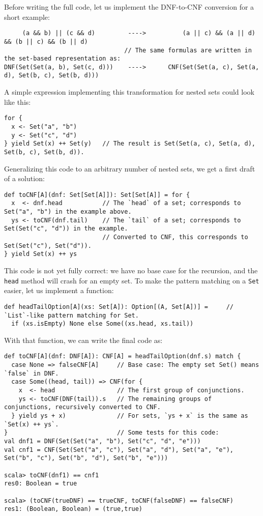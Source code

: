 Before writing the full code, let us implement the DNF-to-CNF conversion
for a short example: 
\begin{lstlisting}
     (a && b) || (c && d)         ---->          (a || c) && (a || d) && (b || c) && (b || d)
                                 // The same formulas are written in the set-based representation as:
DNF(Set(Set(a, b), Set(c, d)))    ---->      CNF(Set(Set(a, c), Set(a, d), Set(b, c), Set(b, d)))
\end{lstlisting}
A simple expression implementing this transformation for nested sets
could look like this: 
\begin{lstlisting}
for {
  x <- Set("a", "b")
  y <- Set("c", "d")
} yield Set(x) ++ Set(y)   // The result is Set(Set(a, c), Set(a, d), Set(b, c), Set(b, d)).
\end{lstlisting}
Generalizing this code to an arbitrary number of nested sets, we get
a first draft of a solution:
\begin{lstlisting}
def toCNF[A](dnf: Set[Set[A]]): Set[Set[A]] = for {
  x  <- dnf.head           // The `head` of a set; corresponds to Set("a", "b") in the example above.
  ys <- toCNF(dnf.tail)    // The `tail` of a set; corresponds to Set(Set("c", "d")) in the example.
                           // Converted to CNF, this corresponds to Set(Set("c"), Set("d")).
} yield Set(x) ++ ys  
\end{lstlisting}
This code is not yet fully correct: we have no base case for the recursion,
and the \lstinline!head! method will crash for an empty set. To make
the pattern matching on a \lstinline!Set! easier, let us implement
a function:
\begin{lstlisting}
def headTailOption[A](xs: Set[A]): Option[(A, Set[A])] =     // `List`-like pattern matching for Set.
  if (xs.isEmpty) None else Some((xs.head, xs.tail))
\end{lstlisting}
With that function, we can write the final code as:
\begin{lstlisting}
def toCNF[A](dnf: DNF[A]): CNF[A] = headTailOption(dnf.s) match {
  case None => falseCNF[A]     // Base case: The empty set Set() means `false` in DNF.
  case Some((head, tail)) => CNF(for {
    x  <- head                 // The first group of conjunctions.
    ys <- toCNF(DNF(tail)).s   // The remaining groups of conjunctions, recursively converted to CNF.
  } yield ys + x)              // For sets, `ys + x` is the same as `Set(x) ++ ys`.
}                              // Some tests for this code:
val dnf1 = DNF(Set(Set("a", "b"), Set("c", "d", "e")))
val cnf1 = CNF(Set(Set("a", "c"), Set("a", "d"), Set("a", "e"), Set("b", "c"), Set("b", "d"), Set("b", "e")))

scala> toCNF(dnf1) == cnf1
res0: Boolean = true 

scala> (toCNF(trueDNF) == trueCNF, toCNF(falseDNF) == falseCNF)
res1: (Boolean, Boolean) = (true,true)
\end{lstlisting}
